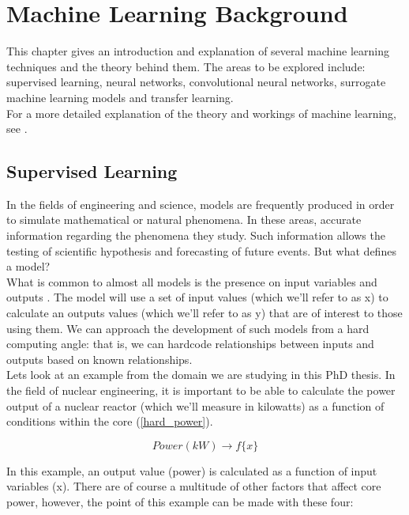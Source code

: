 \chapter{Machine Learning Background}
\label{cha:ML}

This chapter gives an introduction and explanation of several machine learning techniques and the theory behind them. The areas to be explored include: supervised learning, neural networks, convolutional neural networks, surrogate machine learning models and transfer learning. 
\\

\noindent
For a more detailed explanation of the theory and workings of machine learning, see \cite{bishop2006pattern}.


\section{Supervised Learning} \label{supervised}

In the fields of engineering and science, models are frequently produced in order to simulate mathematical or natural phenomena. In these areas, accurate information regarding the phenomena they study. Such information allows the testing of scientific hypothesis and forecasting of future events. But what defines a model? \\

\noindent 
What is common to almost all models is the presence on input variables  and outputs . The model will use a set of input values (which we'll refer to as x) to calculate an outputs values (which we'll refer to as y) that are of interest to those using them. We can approach the development of such models from a hard computing angle: that is, we can hardcode relationships between inputs and outputs based on known relationships. \\

\noindent
Lets look at an example from the domain we are studying in this PhD thesis. In the  field of nuclear engineering, it is important to be able to calculate the power output of a nuclear reactor (which we'll measure in kilowatts) as a function of conditions within the core (\ref{hard_power}).

\begin{equation} \label{hard_power}
	Power(kW)  \rightarrow f\{x\}
\end{equation}

\noindent
In this example, an output value (power) is calculated as a function of input variables (x). There are of course a multitude of other factors that affect core power, however, the point of this example can be made with these four:


